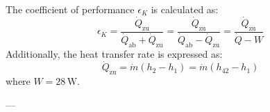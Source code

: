 The coefficient of performance \( \epsilon_K \) is calculated as:  
\[
\epsilon_K = \frac{\dot{Q}_{\text{zu}}}{\dot{Q}_{\text{ab}} + \dot{Q}_{\text{zu}}} = \frac{\dot{Q}_{\text{zu}}}{\dot{Q}_{\text{ab}} - \dot{Q}_{\text{zu}}} = \frac{\dot{Q}_{\text{zu}}}{\dot{Q} - W}
\]  
Additionally, the heat transfer rate is expressed as:  
\[
\dot{Q}_{\text{zu}} = \dot{m} \left( h_2 - h_1 \right) = \dot{m} \left( h_{42} - h_1 \right)
\]  
where \( W = 28 \, \text{W} \).  

---